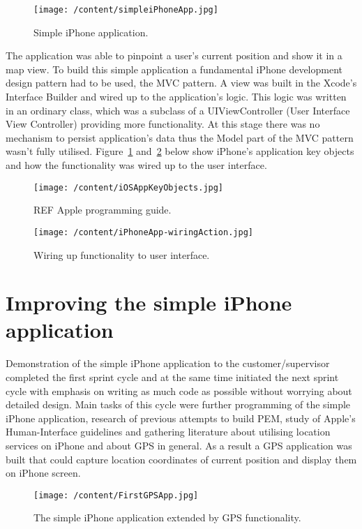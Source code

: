 \documentclass[12pt, a4paper]{report}   %
\begin{document}
\begin{enumerate}
\begin{figure}[H]
  \centering
	\texttt{[image: /content/simpleiPhoneApp.jpg]}
	  \caption{Simple iPhone application.}
\end{figure}


The application was able to pinpoint a user's current position and show it in a map view. To build this simple application a fundamental iPhone development design pattern had to be used, the MVC pattern. A view was built in the Xcode's Interface Builder and wired up to the application's logic. This logic was written in an ordinary class, which was a subclass of a UIViewController (User Interface View Controller) providing more functionality. At this stage there was no mechanism to persist application's data thus the Model part of the MVC pattern wasn't fully utilised. Figure~\ref{iOSAppKeyObjects} and~\ref{iPhoneApp-wiringAction} below show iPhone's application key objects and how the functionality was wired up to the user interface.


\begin{figure}[H]
  \centering
	\texttt{[image: /content/iOSAppKeyObjects.jpg]}
	  \caption{REF Apple programming guide.}
	  \label{iOSAppKeyObjects}
\end{figure}

\begin{figure}[H]
  \centering
	\texttt{[image: /content/iPhoneApp-wiringAction.jpg]}
	  \caption{Wiring up functionality to user interface.}
	  \label{iPhoneApp-wiringAction}
\end{figure}


\clearpage
\section{Improving the simple iPhone application}
Demonstration of the simple iPhone application to the customer/supervisor completed the first sprint cycle and at the same time initiated the next sprint cycle with emphasis on writing as much code as possible without worrying about detailed design. Main tasks of this cycle were further programming of the simple iPhone application, research of previous attempts to build PEM, study of Apple's Human-Interface guidelines and gathering literature about utilising location services on iPhone and about GPS in general. As a result a GPS application was built that could capture location coordinates of current position and display them on iPhone screen.


\begin{figure}[H]
  \centering
	\texttt{[image: /content/FirstGPSApp.jpg]}
	  \caption{The simple iPhone application extended by GPS functionality.}
\end{figure}



\end{enumerate}
\end{document}
